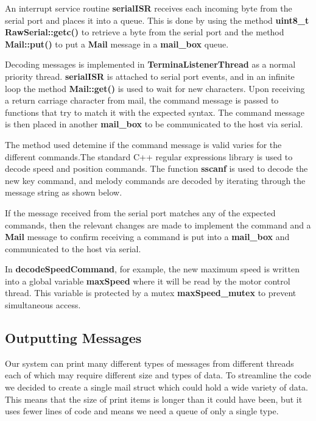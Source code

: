 \documentclass{article}
\begin{document}
\noindent
An interrupt service routine \textbf{serialISR} receives each incoming byte from the serial port and places it into a queue. This is done by using the method \textbf{uint8\_t RawSerial::getc()} to retrieve a byte from the serial port and the method \textbf{Mail::put()} to put a \textbf{Mail} message in a \textbf{mail\_box} queue.
\bigskip

\noindent
Decoding messages is implemented in \textbf{TerminaListenerThread} as a normal priority thread. \textbf{serialISR} is attached to serial port events, and in an infinite loop the method \textbf{Mail::get()} is used to wait for new characters. Upon receiving a return carriage character from mail, the command message is passed to functions that try to match it with the expected syntax. The command message is then placed in another \textbf{mail\_box} to be communicated to the host via serial.

\bigskip

\bigskip

\noindent
The method used detemine if the command message is valid varies for the different commands.The standard C++ regular expressions library is used to decode speed and position commands. The function \textbf{sscanf} is used to decode the new key command, and melody commands are decoded by iterating through the message string as shown below.

\bigskip

\bigskip
If the message received from the serial port matches any of the expected commands, then the relevant changes are made to implement the command and a \textbf{Mail} message to confirm receiving a command is put into a \textbf{mail\_box} and communicated to the host via serial.
\bigskip


\noindent
In \textbf{decodeSpeedCommand}, for example, the new maximum speed is written into a global variable \textbf{maxSpeed} where it will be read by the motor control thread. This variable is protected by a mutex \textbf{maxSpeed\_mutex} to prevent simultaneous access.


\subsection{Outputting Messages}

\noindent
Our system can print many different types of messages from different threads each of which may require different size and types of data.
To streamline the code we decided to create a single mail struct which could hold a wide variety of data. This means that the size of print items is longer than it could have been, but it uses fewer lines of code and means we need a queue of only a single type.
\end{document}
